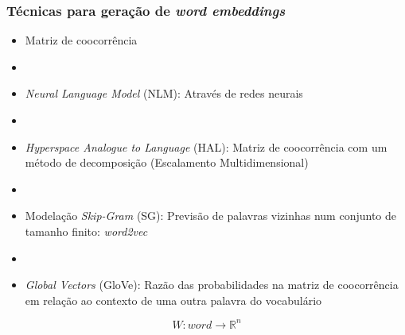 \documentclass[10pt]{beamer}
\begin{document}
\begin{frame}[fragile]
  \frametitle{Técnicas para geração de \protect\textit{word embeddings}}
  
   \begin{itemize}
    \item Matriz de coocorrência

    \item[\ ] \ 

    \item \textit{Neural Language Model} (NLM): Através de redes neurais

    \item[\ ] \ 

    \item \textit{Hyperspace Analogue to Language} (HAL): Matriz de coocorrência com um método de decomposição (Escalamento Multidimensional)

    \item[\ ] \ 

    \item Modelação \textit{Skip-Gram} (SG): Previsão de palavras vizinhas num conjunto de tamanho finito: \textit{word2vec}

    \item[\ ] \ 

    \item \textit{Global Vectors} (GloVe): Razão das probabilidades na matriz de coocorrência em relação ao contexto de uma outra palavra do vocabulário

  \end{itemize}

  \begin{equation}
  W:word \to \mathbb{R}^n \nonumber
  \end{equation}

\end{frame}
\end{document}
